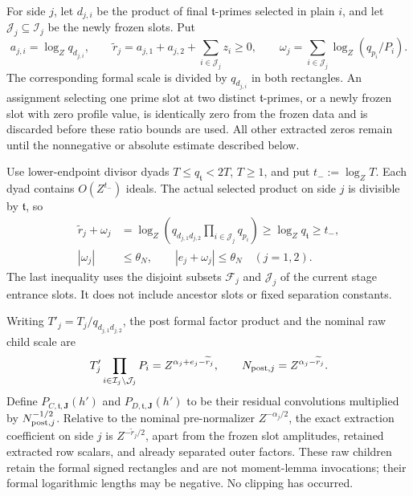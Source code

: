 \documentclass[11pt,a4paper]{article}
\numberwithin{equation}{section}
\numberwithin{figure}{section}
\theoremstyle{definition}
\theoremstyle{remark}
\begin{document}
For side \(j\), let \(d_{j,i}\) be the product of final
\(\mathfrak t\)-primes selected in plain \(i\), and let
\(\mathcal J_j\subseteq\mathcal I_j\) be the newly frozen slots.  Put
\[
 a_{j,i}=\log_Zq_{d_{j,i}},\qquad
 \widetilde r_j=a_{j,1}+a_{j,2}+\sum_{i\in\mathcal J_j}z_i\ge0,
 \qquad
 \omega_j=\sum_{i\in\mathcal J_j}\log_Z(q_{p_i}/P_i).
\]
The corresponding formal scale is divided by \(q_{d_{j,i}}\) in both
rectangles.  An assignment selecting one prime slot at two distinct
\(\mathfrak t\)-primes, or a newly frozen slot with zero profile value,
is identically zero from the frozen data and is discarded before these
ratio bounds are used.  All other extracted zeros remain until the
nonnegative or absolute estimate described below.

Use lower-endpoint divisor dyads \(T\le q_{\mathfrak t}<2T\),
\(T\ge1\), and put \(t_-:=\log_ZT\).  Each dyad contains
\(O(Z^{t_-})\) ideals.  The actual selected product on side \(j\)
is divisible by \(\mathfrak t\), so
\begin{equation}
 \begin{aligned}
 \widetilde r_j+\omega_j
 &=\log_Z\left(q_{d_{j,1}d_{j,2}}
                  \prod_{i\in\mathcal J_j}q_{p_i}\right)
 \ge\log_Zq_{\mathfrak t}\ge t_-,\\
 |\omega_j|&\le\theta_N,\qquad |e_j+\omega_j|\le\theta_N
 \quad(j=1,2).
 \end{aligned}
 \label{eq:centered-divisor-boundary}
\end{equation}
The last inequality uses the disjoint subsets \(\mathcal F_j\) and
\(\mathcal J_j\) of the current stage entrance slots.  It does not
include ancestor slots or fixed separation constants.

Writing \(T'_j=T_j/q_{d_{j,1}d_{j,2}}\), the post formal factor product
and the nominal raw child scale are
\begin{equation}
 T'_j\prod_{i\in\mathcal I_j\setminus\mathcal J_j}P_i
   =Z^{\alpha_j+e_j-\widetilde r_j},\qquad
 N_{{\rm post},j}=Z^{\alpha_j-\widetilde r_j}.
 \label{eq:centered-raw-normalization}
\end{equation}
Define \(P_{C,\mathfrak t,\mathbf J}(h')\) and
\(P_{D,\mathfrak t,\mathbf J}(h')\) to be their residual convolutions
multiplied by \(N_{{\rm post},j}^{-1/2}\).  Relative to the nominal
pre-normalizer \(Z^{-\alpha_j/2}\), the exact extraction coefficient
on side \(j\) is \(Z^{-\widetilde r_j/2}\), apart from the frozen slot
amplitudes, retained extracted row scalars, and already separated outer
factors.  These raw children retain the formal signed rectangles and are
not moment-lemma invocations; their formal logarithmic lengths may be
negative.  No clipping has occurred.
\end{document}
